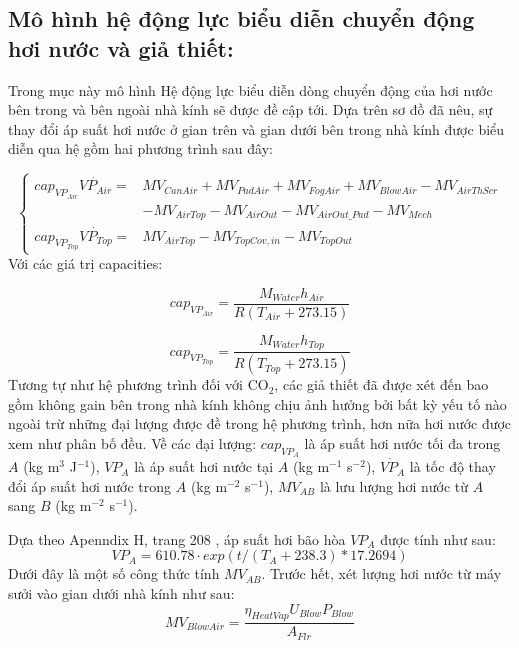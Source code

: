 \documentclass[a4paper]{article}
\begin{document}
\subsection{Mô hình hệ động lực biểu diễn chuyển động hơi nước và giả thiết:}
Trong mục này mô hình Hệ động lực biểu diễn dòng chuyển động của hơi nước bên trong và bên ngoài nhà kính sẽ được đề cập tới. Dựa trên sơ đồ đã nêu, sự thay đổi áp suất hơi nước ở gian trên và gian dưới bên trong nhà kính được biểu diễn qua hệ gồm hai phương trình sau đây:

\begin{equation}
\begin{cases}
        cap_{VP_{Air}} \dot{VP_{Air}} = & MV_{CanAir} + MV_{PadAir} + MV_{FogAir} + MV_{BlowAir} - MV_{AirThScr} \\
         &- MV_{AirTop}-MV_{AirOut}-MV_{AirOut\_Pad}-MV_{Mech}\\
         cap_{VP_{Top}} \dot{VP_{Top}} = & MV_{AirTop} - MV_{TopCov,in} - MV_{TopOut}
     	
    \end{cases}
\end{equation}
Với các giá trị capacities:

\begin{equation}
cap_{VP_{Air}} = \frac{M_{Water}h_{Air}}{R(T_{Air}+273.15)}
\end{equation}

\begin{equation}
cap_{VP_{Top}} = \frac{M_{Water}h_{Top}}{R(T_{Top}+273.15)}
\end{equation}
Tương tự như hệ phương trình đối với $\mathrm{CO_2}$, các giả thiết đã được xét đến bao gồm không gain bên trong nhà kính không chịu ảnh hưởng bởi bất kỳ yếu tố nào ngoài trừ những đại lượng được đề trong hệ phương trình, hơn nữa hơi nước được xem như phân bố đều. Về các đại lượng: $cap_{VP_A}$ là áp suất hơi nước tối đa trong $A$ (kg m$^3$ J$^{-1}$), $VP_A$ là áp suất hơi nước tại $A$ (kg m$^{-1}$ s$^{-2}$), $\dot{VP_A}$ là tốc độ thay đổi áp suất hơi nước trong $A$ (kg m$^{-2}$ s$^{-1}$), $MV_{AB}$ là lưu lượng hơi nước từ $A$ sang $B$ (kg m$^{-2}$ s$^{-1}$).

Dựa theo Apenndix H, trang 208 \cite{dezwart}, áp suất hơi bão hòa $VP_A$ được tính như sau:
\begin{equation}
    VP_A = 610.78 \cdot exp( t / ( T_A + 238.3 ) * 17.2694 )
\end{equation}
Dưới đây là một số công thức tính $MV_{AB}$. Trước hết, xét lượng hơi nước từ máy sưởi vào gian dưới nhà kính như sau:
 \begin{equation}\label{eq:mv_blowair}
	MV_{BlowAir} = \frac{\eta_{HeatVap}U_{Blow}P_{Blow}}{A_{Flr}} 
 \end{equation}
\end{document}
